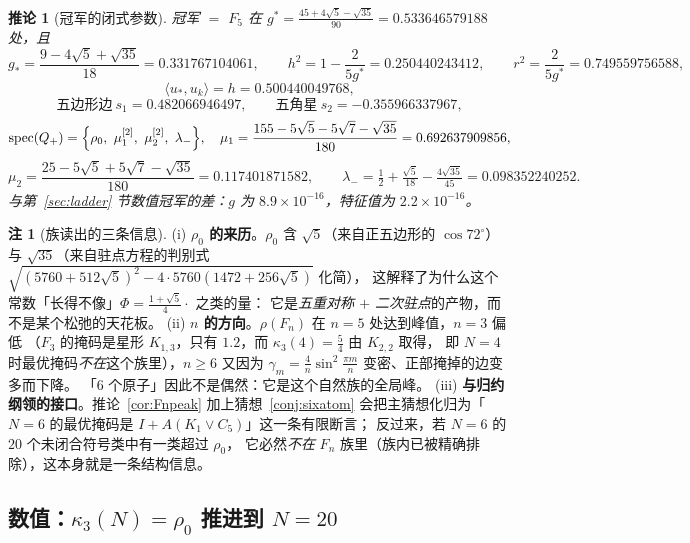 \documentclass[UTF8,11pt]{ctexart}
\newtheorem{corollary}[theorem]{推论}
\theoremstyle{definition}
\newtheorem{remark}[theorem]{注}
\begin{document}
\begin{corollary}[冠军的闭式参数]\label{cor:champclosed}
冠军 $=$ $F_5$ 在 $g^*=\frac{45+4\sqrt5-\sqrt{35}}{90}=0.533646579188$ 处，且
\[
g_*=\frac{9-4\sqrt5+\sqrt{35}}{18}=0.331767104061,\qquad
h^2=1-\frac2{5g^*}=0.250440243412,\qquad
r^2=\frac2{5g^*}=0.749559756588,
\]
\[
\langle u_*,u_k\rangle=h=0.500440049768,
\]
\[
\text{五边形边}\ s_1=0.482066946497,\qquad \text{五角星}\ s_2=-0.355966337967,
\]
\[
\mathrm{spec}(Q_+)=\Bigl\{\rho_0,\ \mu_1^{[2]},\ \mu_2^{[2]},\ \lambda_-\Bigr\},\quad
\mu_1=\frac{155-5\sqrt5-5\sqrt7-\sqrt{35}}{180}=0.692637909856,
\]
\[
\mu_2=\frac{25-5\sqrt5+5\sqrt7-\sqrt{35}}{180}=0.117401871582,\qquad
\lambda_-=\tfrac12+\tfrac{\sqrt5}{18}-\tfrac{4\sqrt{35}}{45}=0.098352240252 .
\]
与第~\ref{sec:ladder} 节数值冠军的差：$g$ 为 $8.9\times10^{-16}$，特征值为 $2.2\times10^{-16}$。
\end{corollary}

\begin{remark}[族读出的三条信息]\label{rmk:Fnread}
(i) \textbf{$\rho_0$ 的来历}。$\rho_0$ 含 $\sqrt5$（来自正五边形的 $\cos72^\circ$）与
$\sqrt{35}$（来自驻点方程的判别式 $\sqrt{(5760+512\sqrt5)^2-4\cdot5760(1472+256\sqrt5)}$ 化简），
这解释了为什么这个常数「长得不像」$\Phi=\frac{1+\sqrt5}4\cdot$ 之类的量：
它是\emph{五重对称 $+$ 二次驻点}的产物，而不是某个松弛的天花板。
(ii) \textbf{$n$ 的方向}。$\rho(F_n)$ 在 $n=5$ 处达到峰值，$n=3$ 偏低
（$F_3$ 的掩码是星形 $K_{1,3}$，只有 $1.2$，而 $\kappa_3(4)=\frac54$ 由 $K_{2,2}$ 取得，
即 $N=4$ 时最优掩码\emph{不在}这个族里），$n\ge6$ 又因为
$\gamma_m=\frac4n\sin^2\frac{\pi m}n$ 变密、正部掩掉的边变多而下降。
「$6$ 个原子」因此不是偶然：它是这个自然族的全局峰。
(iii) \textbf{与归约纲领的接口}。推论~\ref{cor:Fnpeak} 加上猜想~\ref{conj:sixatom}
会把主猜想化归为「$N=6$ 的最优掩码是 $I+A(K_1\vee C_5)$」这一条有限断言；
反过来，若 $N=6$ 的 $20$ 个未闭合符号类中有一类超过 $\rho_0$，
它必然\emph{不在} $F_n$ 族里（族内已被精确排除），这本身就是一条结构信息。
\end{remark}

\subsection{数值：$\kappa_3(N)=\rho_0$ 推进到 $N=20$}\label{sec:harm:num}
\end{document}
